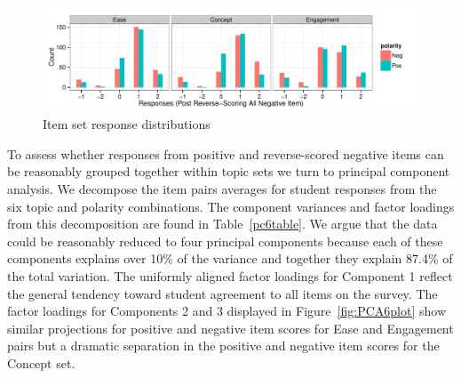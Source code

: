 \documentclass{article}\usepackage[]{graphicx}\usepackage[]{color}
\newenvironment{knitrout}{}{} %
\begin{document}
\begin{knitrout}
\color{fgcolor}\begin{figure}[hbt]


{\centering \includegraphics[width=.8\linewidth]{figure/OverallSetBars-1} 

}

\caption[Item set response distributions]{Item set response distributions\label{fig:OverallSetBars}}
\end{figure}


\end{knitrout}


To assess whether responses from positive and reverse-scored negative items can be reasonably grouped together within topic sets we turn to principal component analysis.  We decompose the item pairs averages for student responses from the six topic and polarity combinations. The component variances and factor loadings from this decomposition are found in Table~\ref{pc6table}. We argue that the data could be reasonably reduced to four principal components because each of these components explains over 10\% of the variance and together they explain 87.4\% of the total variation.  The uniformly aligned factor loadings for Component 1 reflect the general tendency toward student agreement to all items on the survey.  The factor loadings for Components 2 and 3 displayed in Figure~\ref{fig:PCA6plot} show similar projections for positive and negative item scores for Ease and Engagement pairs but a dramatic separation in the positive and negative item scores for the Concept set.  \\  
\end{document}

